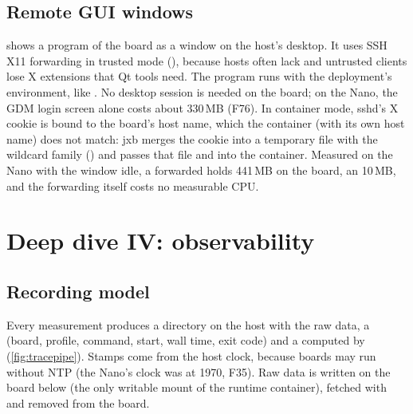 \documentclass[11pt,a4paper]{article}
\newcommand{\jxb}{\textsf{jxb}}
\newcommand{\finding}[1]{\textsf{\small F#1}}
\begin{document}
\subsection{Remote GUI windows}
 shows a program of the board as a window on the host's desktop. It uses SSH X11
forwarding in trusted mode (), because hosts often lack  and untrusted clients lose X extensions
that Qt tools need. The program runs with the deployment's environment, like . No desktop session is
needed on the board; on the Nano, the GDM login screen alone costs about 330\,MB (\finding{76}). In container mode,
sshd's X cookie is bound to the board's host name, which the container (with its own host name) does not match:
\jxb{} merges the cookie into a temporary file with the wildcard family () and passes that file and
 into the container. Measured on the Nano with the window idle, a forwarded  holds 441\,MB
on the board, an  10\,MB, and the forwarding itself costs no measurable CPU.

\section{Deep dive IV: observability}\label{sec:observe}

\subsection{Recording model}
Every measurement produces a directory  on the host with the raw data,
a  (board, profile, command, start, wall time, exit code) and a  computed by
 (\cref{fig:tracepipe}). Stamps come from the host clock, because boards may run without NTP (the
Nano's clock was at 1970, \finding{35}). Raw data is written on the board below  (the only
writable mount of the runtime container), fetched with  and removed from the board.
\end{document}
